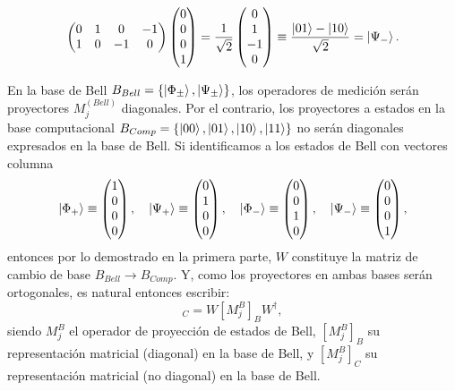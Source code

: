 \documentclass{scrartcl}
\newcommand{\inv}[1]{\frac{1}{#1}}
\DeclareRobustCommand{\[}{\begin{equation}}
\DeclareRobustCommand{\]}{\end{equation}}
\begin{document}
\begin{enumerate}
\[\begin{pmatrix}
            0 & 1 & 0 & -1 \\
            1 & 0 & -1 & 0
        \end{pmatrix}
        \begin{pmatrix} 0 \\ 0 \\ 0 \\ 1 \end{pmatrix}
        = \inv{\sqrt{2}}
        \begin{pmatrix} 0 \\ 1 \\ -1 \\ 0 \end{pmatrix}
        \equiv \frac{\ket{01} - \ket{10}}{\sqrt{2}} = \ket{\Psi_-}.
    \]
    
    En la base de Bell $B_{Bell} = \{ \ket{\Phi_\pm}, \ket{\Psi_\pm} \}$, los operadores de medición serán proyectores $M^{(Bell)}_j$ diagonales. Por el contrario, los proyectores a estados en la base computacional $B_{Comp} = \{ \ket{00}, \ket{01}, \ket{10}, \ket{11} \}$ no serán diagonales expresados en la base de Bell. Si identificamos a los estados de Bell con vectores columna
    \[ \ket{\Phi_+} \equiv \begin{pmatrix} 1 \\ 0 \\ 0 \\ 0 \end{pmatrix}, \quad \ket{\Psi_+} \equiv \begin{pmatrix} 0 \\ 1 \\ 0 \\ 0 \end{pmatrix}, \quad \ket{\Phi_-} \equiv \begin{pmatrix} 0 \\ 0 \\ 1 \\ 0 \end{pmatrix}, \quad \ket{\Psi_-} \equiv \begin{pmatrix} 0 \\ 0 \\ 0 \\ 1 \end{pmatrix}, \]
    entonces por lo demostrado en la primera parte, $W$ constituye la matriz de cambio de base $B_{Bell} \to B_{Comp}$. Y, como los proyectores en ambas bases serán ortogonales, es natural entonces escribir:
    \[ [M^{B}_j]_C = W [M^{B}_j]_B W^\dagger, \]
    siendo $M^{B}_j$ el operador de proyección de estados de Bell, $[M^{B}_j]_B$ su representación matricial (diagonal) en la base de Bell, y $[M^{B}_j]_C$ su representación matricial (no diagonal) en la base de Bell.
    

\end{enumerate}
\end{document}
